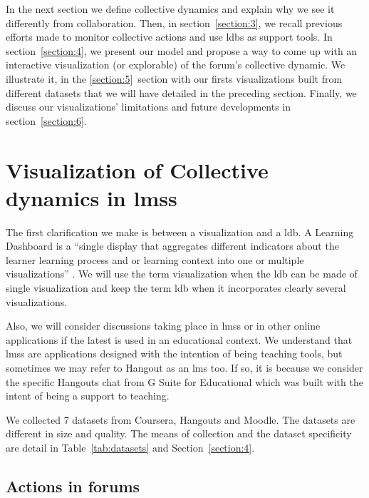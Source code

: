 \documentclass[a4paper,twoside]{article}
\begin{document}
In the next section we define collective dynamics and explain why we see it differently from collaboration.  Then, in section~\ref{section:3}, we recall previous efforts made to  monitor collective actions and use \glspl{ldb} as support tools.  In section~\ref{section:4}, we present our model and propose a way to come up with an interactive visualization (or explorable) of the forum's collective dynamic.  We illustrate it, in the \ref{section:5}~section with our firsts visualizations built from different datasets that we will have detailed in the preceding section.  Finally, we discuss our visualizations' limitations and future developments in section~\ref{section:6}.

\section{Visualization of Collective dynamics in \glspl{lms}}
\label{section:2}

The first clarification we make is between a visualization and a \gls{ldb}.  A Learning Dashboard is a ``single display that aggregates different indicators about the learner learning process and or learning context into one or multiple visualizations'' \citep{Schwendimann2017}.  We will use the term visualization when the \gls{ldb} can be made of single visualization and keep the term \gls{ldb} when it incorporates clearly several visualizations.

Also, we will consider discussions taking place in \glspl{lms} or in other online applications if the latest is used in an educational context.  We understand that \glspl{lms} are applications designed with the intention of being teaching tools, but sometimes we may refer to Hangout as an \gls{lms} too.   If so, it is because we consider the specific Hangouts chat from G Suite for Educational which was built with the intent of being a support to teaching.

We collected 7 datasets from Coursera, Hangouts and Moodle.  The datasets are different in size and quality.  The means of collection and the dataset specificity are detail in Table~\ref{tab:datasets} and Section~\ref{section:4}.  

\subsection{Actions in forums}
\end{document}
